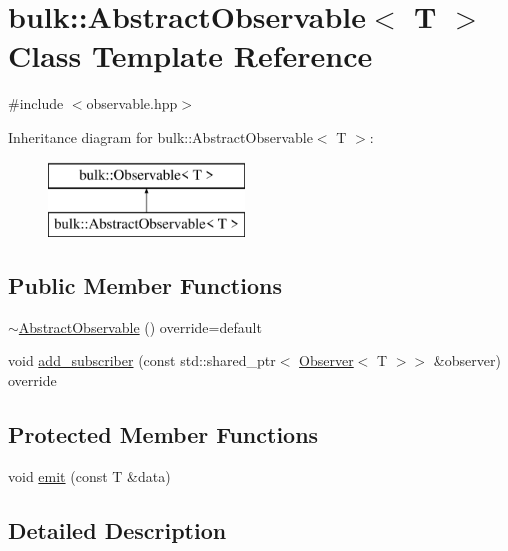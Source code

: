 \hypertarget{classbulk_1_1AbstractObservable}{}\section{bulk\+:\+:Abstract\+Observable$<$ T $>$ Class Template Reference}
\label{classbulk_1_1AbstractObservable}


{\ttfamily \#include $<$observable.\+hpp$>$}

Inheritance diagram for bulk\+:\+:Abstract\+Observable$<$ T $>$\+:\begin{figure}[H]
\begin{center}
\leavevmode
\includegraphics[height=2.000000cm]{classbulk_1_1AbstractObservable}
\end{center}
\end{figure}
\subsection*{Public Member Functions}
\begin{DoxyCompactItemize}
\item 
\hyperlink{classbulk_1_1AbstractObservable_a8fe881a61345c8df0c201a2e266605ef}{$\sim$\+Abstract\+Observable} () override=default
\item 
void \hyperlink{classbulk_1_1AbstractObservable_a39be332eeed3b432a461faae184ba34b}{add\+\_\+subscriber} (const std\+::shared\+\_\+ptr$<$ \hyperlink{classbulk_1_1Observer}{Observer}$<$ T $>$$>$ \&observer) override
\end{DoxyCompactItemize}
\subsection*{Protected Member Functions}
\begin{DoxyCompactItemize}
\item 
void \hyperlink{classbulk_1_1AbstractObservable_a95ccf77b0c8774129fd1d2b25642356e}{emit} (const T \&data)
\end{DoxyCompactItemize}


\subsection{Detailed Description}
